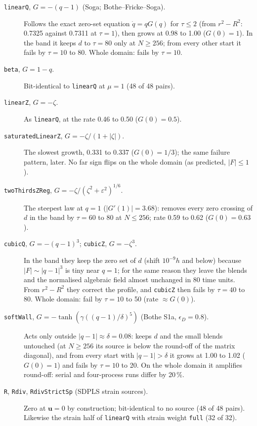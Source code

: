 \documentclass[11pt,a4paper]{article}
\begin{document}
\begin{description}
\item[\texttt{linearQ}, $G=-(q-1)$ (Soga; Bothe--Fricke--Soga).] Follows the exact zero-set equation
$\dot q=qG(q)$ for $\tau\le2$ (from $r^2-R^2$: 0.7325 against 0.7311 at $\tau=1$), then grows at
0.98 to 1.00 ($G(0)=1$). In the band it keeps $d$ to $\tau=80$ only at $N\ge256$; from every
other start it fails by $\tau=10$ to 80. Whole domain: fails by $\tau=10$.
\item[\texttt{beta}, $G=1-q$.] Bit-identical to \texttt{linearQ} at $\mu=1$ (48 of 48 pairs).
\item[\texttt{linearZ}, $G=-\zeta$.] As \texttt{linearQ}, at the rate 0.46 to 0.50 ($G(0)=0.5$).
\item[\texttt{saturatedLinearZ}, $G=-\zeta/(1+|\zeta|)$.] The slowest growth, 0.331 to 0.337
($G(0)=1/3$); the same failure pattern, later. No far sign flips on the whole domain (as
predicted, $|F|\le1$).
\item[\texttt{twoThirdsZReg}, $G=-\zeta/(\zeta^2+\varepsilon^2)^{1/6}$.] The steepest law at $q=1$
($|G'(1)|=3.68$): removes every zero crossing of $d$ in the band by $\tau=60$ to 80 at
$N\le256$; rate 0.59 to 0.62 ($G(0)=0.63$).
\item[\texttt{cubicQ}, $G=-(q-1)^3$; \texttt{cubicZ}, $G=-\zeta^3$.] In the band they keep the zero
set of $d$ (shift $10^{-9}h$ and below) because $|F|\sim|q-1|^3$ is tiny near $q=1$; for the same
reason they leave the blends and the normalised algebraic field almost unchanged in 80 time
units. From $r^2-R^2$ they correct the profile, and \texttt{cubicZ} then fails by $\tau=40$ to 80.
Whole domain: fail by $\tau=10$ to 50 (rate $\approx G(0)$).
\item[\texttt{softWall}, $G=-\tanh(\gamma((q-1)/\delta)^5)$ (Bothe S1a, $\epsilon_D=0.8$).] Acts only
outside $|q-1|\approx\delta=0.08$: keeps $d$ and the small blends untouched (at $N\ge256$ its source
is below the round-off of the matrix diagonal), and from every start with $|q-1|>\delta$ it grows at
1.00 to 1.02 ($G(0)=1$) and fails by $\tau=10$ to 20. On the whole domain it amplifies round-off:
serial and four-process runs differ by 20\,\%.
\item[\texttt{R}, \texttt{Rdiv}, \texttt{RdivStrictSp} (SDPLS strain sources).] Zero at
$\mathbf u=0$ by construction; bit-identical to no source (48 of 48 pairs). Likewise the strain
half of \texttt{linearQ} with strain weight \texttt{full} (32 of 32).
\end{description}
\end{document}
